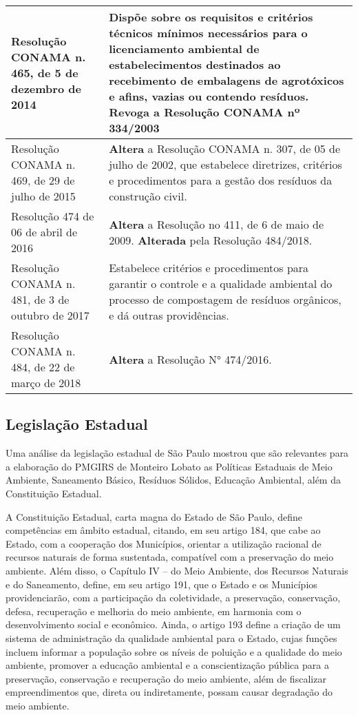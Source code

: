 \begin{center}
\begin{longtable}{|p{}|p{}|}
			\hline			
			Resolução   CONAMA   n.   465, de 5 de dezembro de 2014 & Dispõe  sobre  os  requisitos  e  critérios  técnicos  mínimos  necessários  para  o licenciamento  ambiental  de  estabelecimentos  destinados  ao  recebimento  de embalagens de agrotóxicos e afins, vazias ou contendo resíduos. \textbf{Revoga} a Resolução CONAMA nº 334/2003 \\
			\hline
			Resolução   CONAMA   n.   469, de 29 de julho de 2015 & \textbf{Altera} a Resolução CONAMA n. 307, de 05 de julho de 2002, que estabelece diretrizes, critérios e procedimentos para a gestão dos resíduos da construção civil. \\
			\hline
			Resolução 474 de 06 de abril de 2016 & \textbf{Altera} a Resolução no 411, de 6 de maio de 2009.\textbf{ Alterada} pela Resolução 484/2018.\\
			\hline
			Resolução   CONAMA   n.   481, de 3 de outubro de 2017 & Estabelece  critérios  e  procedimentos  para  garantir  o  controle  e  a  qualidade ambiental do processo de compostagem  de resíduos  orgânicos, e dá outras providências. \\
			\hline
			Resolução CONAMA n. 484, de 22 de março de 2018 & \textbf{Altera} a Resolução N° 474/2016. \\
			\hline 
			
		\end{longtable}
	\end{center}
	\renewcommand\LTcaptype{table}

	\subsection{Legislação Estadual}
	
	Uma análise da legislação estadual de São Paulo mostrou que são relevantes para a elaboração do PMGIRS de Monteiro Lobato as Políticas Estaduais de Meio Ambiente, Saneamento Básico, Resíduos Sólidos, Educação Ambiental, além da Constituição Estadual. 
	
	A Constituição Estadual, carta magna do Estado de São Paulo, define competências em âmbito estadual, citando, em seu artigo 184, que cabe ao Estado, com a cooperação dos Municípios, orientar a utilização racional de recursos naturais de forma sustentada, compatível com a preservação do meio ambiente. Além disso, o Capítulo IV – do Meio Ambiente, dos Recursos Naturais e do Saneamento, define, em seu artigo 191, que o Estado e os Municípios providenciarão, com a participação da coletividade, a preservação, conservação, defesa, recuperação e melhoria do meio ambiente, em harmonia com o desenvolvimento social e econômico. Ainda, o artigo 193 define a criação de um sistema de administração da qualidade ambiental para o Estado, cujas funções incluem informar a população sobre os níveis de poluição e a qualidade do meio ambiente, promover a educação ambiental e a conscientização pública para a preservação, conservação e recuperação do meio ambiente, além de fiscalizar empreendimentos que, direta ou indiretamente, possam causar degradação do meio ambiente.
	
